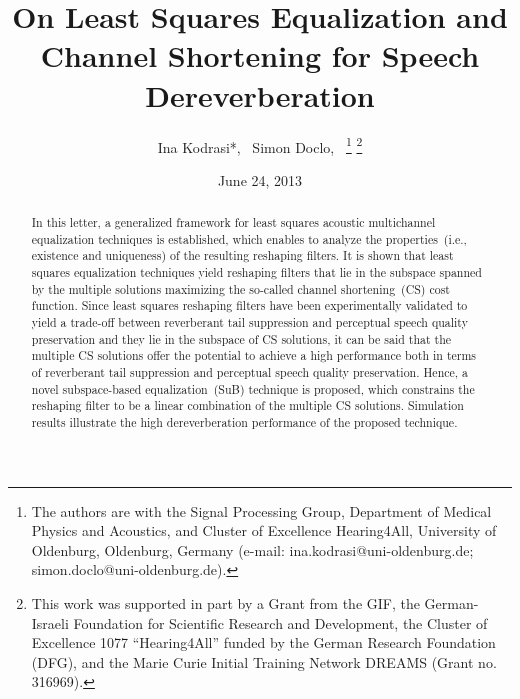 \documentclass[10pt]{IEEEtran}
\begin{document}
\newlength\figureheight
\newlength\figurewidth
\setlength\figureheight{3.6cm}
\setlength\figurewidth{6.5cm}
\title{On Least Squares Equalization and Channel Shortening for Speech Dereverberation}

\date{June 24, 2013}

\author{Ina Kodrasi*,~ Simon Doclo,~%
\thanks{The authors are with the Signal Processing Group, Department of Medical Physics and Acoustics, and Cluster of Excellence Hearing4All, University of Oldenburg, Oldenburg, Germany (e-mail: \mbox{ina.kodrasi@uni-oldenburg.de}; simon.doclo@uni-oldenburg.de).}
\thanks{
This work was supported in part by a Grant from the GIF, the German-Israeli Foundation for Scientific Research and Development, the Cluster of Excellence 1077 ``Hearing4All'' funded by the German Research Foundation (DFG), and the Marie Curie Initial Training Network DREAMS (Grant no. 316969).}
}



\maketitle

\begin{abstract}

In this letter, a generalized framework for least squares acoustic multichannel equalization techniques is established, which enables to analyze the properties~(i.e., existence and uniqueness) of the resulting reshaping filters.
It is shown that least squares equalization techniques yield reshaping filters that lie in the subspace spanned by the multiple solutions maximizing the so-called channel shortening~(CS) cost function.
Since least squares reshaping filters have been experimentally validated to yield a trade-off between reverberant tail suppression and perceptual speech quality preservation and they lie in the subspace of CS solutions, it can be said that the multiple CS solutions offer the potential to achieve a high performance both in terms of reverberant tail suppression and perceptual speech quality preservation.
Hence, a novel subspace-based equalization~(SuB) technique is proposed, which constrains the reshaping filter to be a linear combination of the multiple CS solutions. 
Simulation results illustrate the high dereverberation performance of the proposed technique.
\end{abstract}
\end{document}
